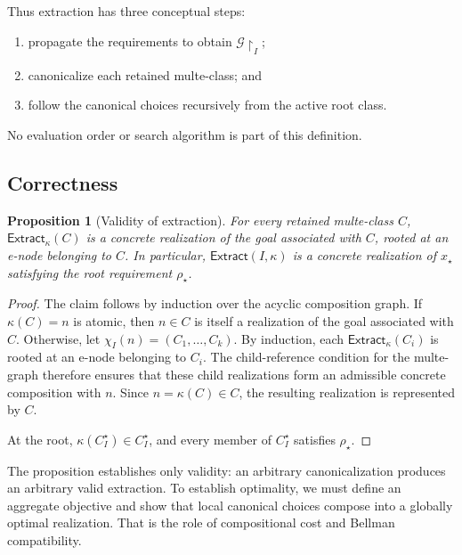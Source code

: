 \documentclass[sigconf,nonacm]{acmart}
\theoremstyle{definition}
\theoremstyle{plain}
\newtheorem{proposition}[definition]{Proposition}
\theoremstyle{remark}
\begin{document}
Thus extraction has three conceptual steps:

\begin{enumerate}

\item
propagate the requirements to obtain
\(\mathcal G\!\restriction_I\);

\item
canonicalize each retained multe-class; and

\item
follow the canonical choices recursively from the active root class.

\end{enumerate}

No evaluation order or search algorithm is part of this definition.

\subsection{Correctness}
\label{sec:extraction-correctness}

\begin{proposition}[Validity of extraction]
For every retained multe-class \(C\),
\(\mathsf{Extract}_{\kappa}(C)\)
is a concrete realization of the goal associated with \(C\), rooted at
an e-node belonging to \(C\).
In particular, \(\mathsf{Extract}(I,\kappa)\)
is a concrete realization of \(x_\star\) satisfying the root
requirement \(\rho_\star\).
\end{proposition}

\begin{proof}
The claim follows by induction over the acyclic composition graph.
If \(\kappa(C)=n\)
is atomic, then \(n\in C\) is itself a realization of the goal
associated with \(C\).
Otherwise, let \(\chi_I(n)=(C_1,\ldots,C_k)\).
By induction, each \(\mathsf{Extract}_{\kappa}(C_i)\)
is rooted at an e-node belonging to \(C_i\).
The child-reference condition for the multe-graph therefore ensures
that these child realizations form an admissible concrete composition
with \(n\).
Since \(n=\kappa(C)\in C\), the resulting realization is represented
by \(C\).

At the root, \(\kappa(C^\star_I)\in C^\star_I\),
and every member of \(C^\star_I\) satisfies \(\rho_\star\).
\end{proof}

The proposition establishes only validity: an arbitrary
canonicalization produces an arbitrary valid extraction.  To establish
optimality, we must define an aggregate objective and show that local
canonical choices compose into a globally optimal realization.  That is
the role of compositional cost and Bellman compatibility.
\end{document}
